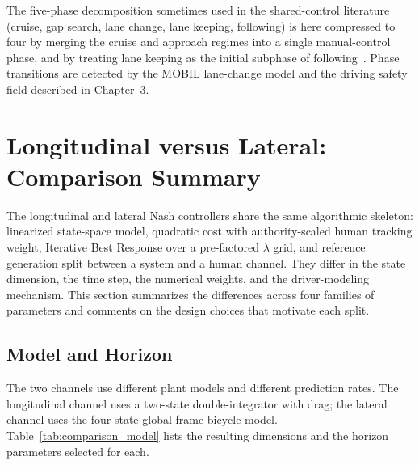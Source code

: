 \documentclass[12pt,a4paper,oneside]{report}
\begin{document}
The five-phase decomposition sometimes used in the shared-control literature (cruise, gap search, lane change, lane keeping, following) is here compressed to four by merging the cruise and approach regimes into a single manual-control phase, and by treating lane keeping as the initial subphase of following~\cite{kestingGeneralLaneChangingModel2007, kestingMOBILGeneralLaneChanging}. Phase transitions are detected by the MOBIL lane-change model and the driving safety field described in Chapter~3.
\section{Longitudinal versus Lateral: Comparison Summary}
\label{sec:comparison}

The longitudinal and lateral Nash controllers share the same algorithmic skeleton: linearized state-space model, quadratic cost with authority-scaled human tracking weight, Iterative Best Response over a pre-factored $\lambda$ grid, and reference generation split between a system and a human channel. They differ in the state dimension, the time step, the numerical weights, and the driver-modeling mechanism. This section summarizes the differences across four families of parameters and comments on the design choices that motivate each split.

\subsection{Model and Horizon}

The two channels use different plant models and different prediction rates. The longitudinal channel uses a two-state double-integrator with drag; the lateral channel uses the four-state global-frame bicycle model. Table~\ref{tab:comparison_model} lists the resulting dimensions and the horizon parameters selected for each.
\end{document}
